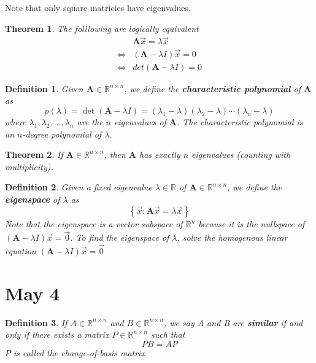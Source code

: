 \documentclass[11pt]{article}
\newtheorem{thm}{Theorem}
\newtheorem{defn}{Definition}
\begin{document}
Note that only square matricies have eigenvalues.

\begin{thm}
  The folllowing are logically equivalent
  \begin{align*}
    &\mathbf{A}\vec{x} = \lambda \vec{x} \\
    \iff& (\mathbf{A}-\lambda I) \vec{x} = 0 \\
    \iff& det(\mathbf{A} - \lambda I) = 0
  \end{align*}
\end{thm}

\begin{defn}
  Given $\mathbf{A} \in \mathbb{R}^{n \times n}$, we define the \textbf{characteristic polynomial} of $\mathbf{A}$ as
  \[p(\lambda) = \det(\mathbf{A}-\lambda I) = (\lambda_{1}-\lambda)(\lambda_{2}-\lambda)\cdots(\lambda_{n}-\lambda)\]
  where $\lambda_{1}, \lambda_{2}, \ldots, \lambda_{n}$ are the $n$ eigenvalues of $\mathbf{A}$.
  The characteristic polynomial is an $n$-degree polynomial of $\lambda$.
\end{defn}

\begin{thm}
If $\mathbf{A} \in \mathbb{R}^{n \times n}$, then $\mathbf{A}$ has exactly $n$ eigenvalues (counting with multiplicity).
\end{thm}
\begin{defn}
  Given a fixed eigenvalue $\lambda\in \mathbb{R}$ of $\mathbf{A} \in \mathbb{R}^{n \times n}$, we define the \textbf{eigenspace} of $\lambda$ as
  \[\left\{\vec{x} : \mathbf{A}\vec{x} = \lambda\vec{x}\right\}\]
  Note that the eigenspace is a vector subspace of $\mathbb{R}^{n}$ because it is the nullspace of $(\mathbf{A}-\lambda I) \vec{x} = \vec{0}$. To find
  the eigenspace of $\lambda$, solve the homogenous linear equation $(\mathbf{A} - \lambda I)\vec{x} = \vec{0}$
\end{defn}

\section{May 4}
\begin{defn}
  If $A \in \mathbb{R}^{n \times n}$ and
  $B \in \mathbb{R}^{n \times n}$, we say A and B are \textbf{similar} if and only if there
  exists a matrix $P \in \mathbb{R}^{n \times n}$ such that
  \[PB = AP\]
  $P $ is called the change-of-basis matrix
\end{defn}
\end{document}
